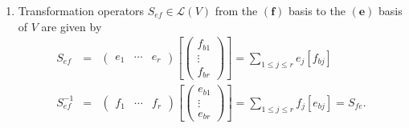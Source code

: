 \documentclass[aps,preprint]{revtex4}
\begin{document}
\begin{enumerate}
\item Transformation operators $S_{ef}\in \mathcal{L}\left( V\right) $ from
the $\left( \boldsymbol{f}\right) $ basis to the $\left( \boldsymbol{e}%
\right) $ basis of $V$ are given by 
\begin{eqnarray}
S_{ef} &=&\left( 
\begin{array}{ccc}
e_{1} & \cdots & e_{r}%
\end{array}%
\right) \left[ \left( 
\begin{array}{c}
f_{b1} \\ 
\vdots \\ 
f_{br}%
\end{array}%
\right) \right] =\sum_{1\leq j\leq r}e_{j}\left[ f_{bj}\right] \\
S_{ef}^{-1} &=&\left( 
\begin{array}{ccc}
f_{1} & \cdots & f_{r}%
\end{array}%
\right) \left[ \left( 
\begin{array}{c}
e_{b1} \\ 
\vdots \\ 
e_{br}%
\end{array}%
\right) \right] =\sum_{1\leq j\leq r}f_{j}\left[ e_{bj}\right] =S_{fe}.
\end{eqnarray}


\end{enumerate}
\end{document}
